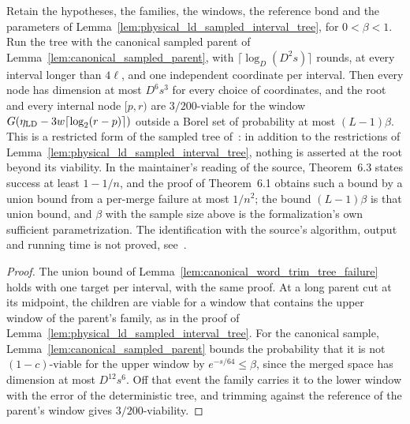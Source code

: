 \begin{lemma}
    \label{lem:physical_ld_tree_probability}
    \leanok
    Retain the hypotheses, the families, the windows, the reference bond and
    the parameters of Lemma~\ref{lem:physical_ld_sampled_interval_tree}, for
    $0<\beta<1$. Run the tree with the canonical sampled parent of
    Lemma~\ref{lem:canonical_sampled_parent}, with
    $\lceil\log_D(D^2s)\rceil$ rounds, at every interval longer than
    $4\ell$, and one independent coordinate per interval. Then every node has
    dimension at most $D^6s^3$ for every choice of coordinates, and the root
    and every internal node $[p,r)$ are $3/200$-viable for the window
    $G(\eta_{\rm LD}-3w\lceil\log_2(r-p)\rceil)$ outside a Borel set of
    probability at most $(L-1)\beta$. This is a restricted form of the
    sampled tree of~\cite[Theorem~\texttt{t:alg2}, lines
        1869--1878]{Arad2016RigorousRG}: in addition to the restrictions of
    Lemma~\ref{lem:physical_ld_sampled_interval_tree}, nothing is asserted
    at the root beyond its viability. In the maintainer's reading of the
    source, Theorem~6.3 states success at least $1-1/n$, and the proof of
    Theorem~6.1 obtains such a bound by a union bound from a per-merge
    failure at most $1/n^2$; the bound $(L-1)\beta$ is that union bound, and
    $\beta$ with the sample size above is the formalization's own sufficient
    parametrization. The identification with the source's algorithm, output
    and running time is not proved,
    see~\cite{gap:alvv16_low_energy_family_scope}.
\end{lemma}
\begin{proof}\leanok
    The union bound of Lemma~\ref{lem:canonical_word_trim_tree_failure} holds
    with one target per interval, with the same proof. At a long parent cut at
    its midpoint, the children are viable for a window that contains the upper
    window of the parent's family, as in the proof of
    Lemma~\ref{lem:physical_ld_sampled_interval_tree}. For the canonical
    sample, Lemma~\ref{lem:canonical_sampled_parent} bounds the probability
    that it is not $(1-c)$-viable for the upper window by
    $e^{-s/64}\le\beta$, since the merged space has dimension at most
    $D^{12}s^6$. Off that event the family carries it to the lower window
    with the error of the deterministic tree, and trimming against the
    reference of the parent's window gives $3/200$-viability.
\end{proof}

